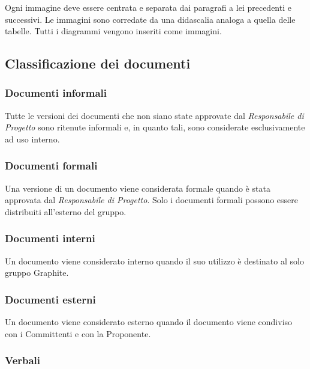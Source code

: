 \documentclass[../NormediProgetto.tex]{subfiles}
\begin{document}
Ogni immagine deve essere centrata e separata dai paragrafi a lei precedenti e successivi. Le immagini sono corredate da una didascalia analoga a quella delle tabelle. Tutti i diagrammi vengono inseriti come immagini.

\subsection{Classificazione dei documenti}

\subsubsection{Documenti informali}

Tutte le versioni dei documenti che non siano state approvate dal \textit{Responsabile di Progetto} sono ritenute informali e, in quanto tali, sono considerate esclusivamente ad uso interno.

\subsubsection{Documenti formali}

Una versione di un documento viene considerata formale quando è stata approvata dal \textit{Responsabile di Progetto}. Solo i documenti formali possono essere distribuiti all’esterno del gruppo.

\subsubsection{Documenti interni}

Un documento viene considerato interno quando il suo utilizzo è destinato al solo gruppo Graphite.

\subsubsection{Documenti esterni}

Un documento viene considerato esterno quando il documento viene condiviso con i Committenti e con la Proponente.

\subsubsection{Verbali}
\end{document}

